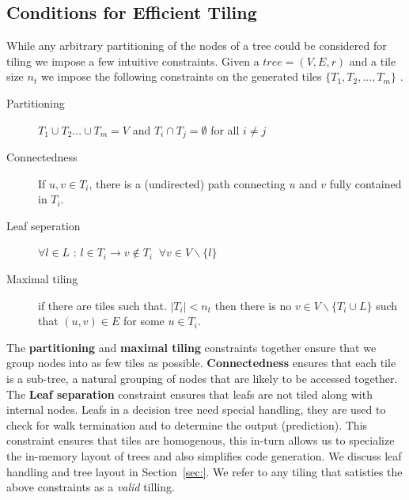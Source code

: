 \subsection*{Conditions for Efficient Tiling}
\label{sec:ValidTiling}
While any arbitrary partitioning of the nodes of a tree could be considered for tiling we impose a few intuitive constraints.
Given a $tree = (V, E, r)$ and a tile size $n_t$ we impose the following constraints on the generated tiles $\{ T_1, T_2, ... ,T_m \}$ .
\begin{description}
    \item[Partitioning] $T_1 \cup T_2 ... \cup T_m = V$ and $T_i \cap T_j = \emptyset$ for all $i\neq j$
    \item[Connectedness] If $u, v \in T_i$, there is a (undirected) path connecting $u$ and $v$ fully contained in $T_i$.
   \item [Leaf seperation] $\forall l \in L$ : $l \in T_i \rightarrow v \notin T_i \;\; \forall v \in V \backslash \{l\}$
  \item [Maximal tiling] if there are tiles such that. $|T_i| < n_t$ then there is no $v \in V\backslash \{ T_i \cup L \}$ such that $(u, v) \in E$ for some $u \in T_i$. 
\end{description}
The \textbf{partitioning} and \textbf{maximal tiling} constraints together ensure that we group nodes into as few tiles as possible. {\textbf{Connectedness}} ensures that each tile is a sub-tree, a natural grouping of nodes that are likely to be accessed together. The {\textbf{Leaf separation}} constraint ensures that leafs are not tiled along with internal nodes. Leafs in a decision tree need special handling, they are used to check for walk termination and to determine the output (prediction). This constraint ensures that tiles are homogenous, this in-turn allows us to specialize the in-memory layout of trees and also simplifies code generation. We discuss leaf handling and tree layout in Section~\ref{sec:}.
We refer to any tiling that satisties the above constraints as a \emph{valid} tilling.
